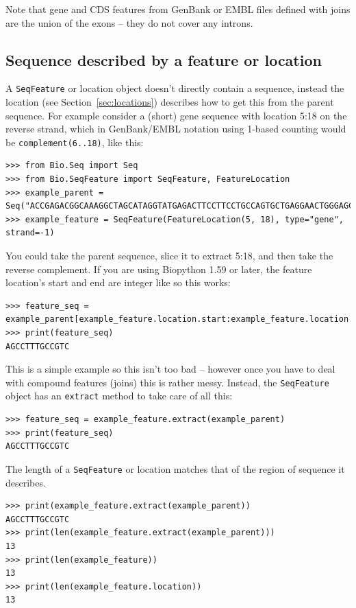 \documentclass{report}
\begin{document}
Note that gene and CDS features from GenBank or EMBL files defined with joins
are the union of the exons -- they do not cover any introns.


\subsection{Sequence described by a feature or location}

A \verb|SeqFeature| or location object doesn't directly contain a sequence, instead the location (see Section~\ref{sec:locations}) describes how to get this from the parent sequence. For example consider a (short) gene sequence with location 5:18 on the reverse strand, which in GenBank/EMBL notation using 1-based counting would be \texttt{complement(6..18)}, like this:

\begin{verbatim}
>>> from Bio.Seq import Seq
>>> from Bio.SeqFeature import SeqFeature, FeatureLocation
>>> example_parent = Seq("ACCGAGACGGCAAAGGCTAGCATAGGTATGAGACTTCCTTCCTGCCAGTGCTGAGGAACTGGGAGCCTAC")
>>> example_feature = SeqFeature(FeatureLocation(5, 18), type="gene", strand=-1)
\end{verbatim}

You could take the parent sequence, slice it to extract 5:18, and then take the reverse complement.
If you are using Biopython 1.59 or later, the feature location's start and end are integer like so this works:

\begin{verbatim}
>>> feature_seq = example_parent[example_feature.location.start:example_feature.location.end].reverse_complement()
>>> print(feature_seq)
AGCCTTTGCCGTC
\end{verbatim}

This is a simple example so this isn't too bad -- however once you have to deal with compound features (joins) this is rather messy. Instead, the \verb|SeqFeature| object has an \verb|extract| method to take care of all this:

\begin{verbatim}
>>> feature_seq = example_feature.extract(example_parent)
>>> print(feature_seq)
AGCCTTTGCCGTC
\end{verbatim}

The length of a \verb|SeqFeature| or location matches
that of the region of sequence it describes.

\begin{verbatim}
>>> print(example_feature.extract(example_parent))
AGCCTTTGCCGTC
>>> print(len(example_feature.extract(example_parent)))
13
>>> print(len(example_feature))
13
>>> print(len(example_feature.location))
13
\end{verbatim}
\end{document}
